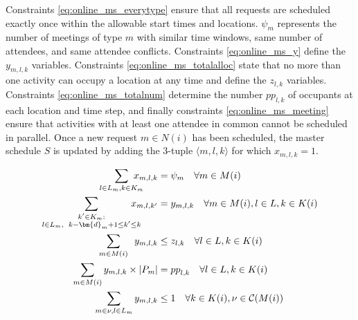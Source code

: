Constraints \eqref{eq:online_ms_everytype} ensure that all requests are scheduled exactly once within the allowable start times and locations. $\psi_m$ represents the number of meetings of type $m$ with similar time windows, same number of attendees, and same attendee conflicts.
Constraints \eqref{eq:online_ms_y} define the $y_{m,l,k}$ variables. Constraints \eqref{eq:online_ms_totalalloc} state that no more than one activity can occupy a location at any time and define the $z_{l,k}$ variables. 
Constraints \eqref{eq:online_ms_totalnum} determine the number ${pp}_{l,k}$ of occupants at each location and time step, and finally constraints \eqref{eq:online_ms_meeting} ensure that activities with at least one attendee in common cannot be scheduled in parallel. 
Once a new request $m\in N(i)$ has been scheduled, the master schedule $S$ is updated by adding the 3-tuple $\langle m,l,k\rangle$ for which $x_{m,l,k} =1$.

\begin{align}
\mathop{\sum \limits_{l\in L_m, k \in K_m}} \hspace{-12pt} x_{m,l,k} &= \psi_m \hspace{10pt} \forall m \in M(i)  \label{eq:online_ms_everytype}  \\
\mathop{\sum \limits_{\substack{k' \in K_m: \\
l\in L_m, \hspace{5pt} k-\bm{d}_m+1 \leq k' \leq k}}} \hspace{-12pt} x_{m,l,k'} & = y_{m,l,k} \hspace{10pt} \forall m \in M(i), l \in L, k \in K(i) \label{eq:online_ms_y} \\
\mathop{\sum \limits_{m \in M(i)}} \hspace{5pt} y_{m,l,k} &\leq z_{l,k} \hspace{10pt} \forall l \in L, k \in K(i) \label{eq:online_ms_totalalloc} \\
\mathop{\sum \limits_{m \in M(i)}} y_{m,l,k}\times \left| P_m\right| &= {pp}_{l,k} \hspace{10pt} \forall l \in L, k \in K(i) \label{eq:online_ms_totalnum} \\
\mathop{\sum \limits_{m \in \nu,l \in L_m}} y_{m,l,k} &\leq 1 \hspace{10pt} \forall k \in K(i), \nu \in {\cal C}(M(i)) \label{eq:online_ms_meeting}
\end{align}

